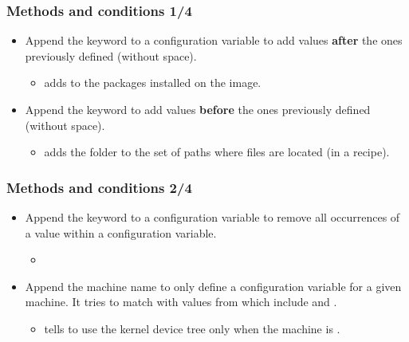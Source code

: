 \begin{frame}
  \frametitle{Methods and conditions 1/4}
  \begin{itemize}
    \item Append the keyword  to a configuration
      variable to add values {\bf after} the ones previously defined
      (without space).
      \begin{itemize}
        \item {} adds
           to the packages installed on the image.
      \end{itemize}
    \item Append the keyword  to add values {\bf
      before} the ones previously defined (without space).
      \begin{itemize}
        \item {}
          adds the folder to the set of paths where files are located
          (in a recipe).
      \end{itemize}
  \end{itemize}
\end{frame}

\begin{frame}
  \frametitle{Methods and conditions 2/4}
  \begin{itemize}
    \item Append the keyword  to a configuration
      variable to remove all occurrences of a value within a
      configuration variable.
      \begin{itemize}
        \item {}
      \end{itemize}
    \item Append the machine name to only define a configuration
      variable for a given machine. It tries to match with values from
       which include  and
      .
      \begin{itemize}
        \item {}
          tells to use the kernel device tree 
          only when the machine is .
      \end{itemize}
  \end{itemize}
\end{frame}

